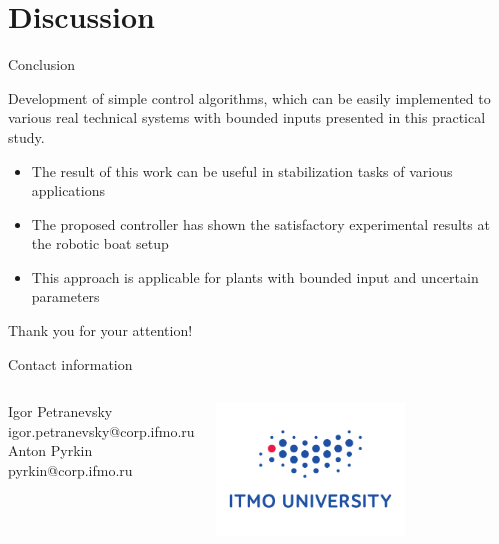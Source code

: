 \documentclass[10pt,pdf,hyperref={unicode}]{beamer}
\begin{document}
\section{Discussion}

\begin{frame}{Conclusion}

Development of simple control algorithms, which can be easily implemented to various real technical systems with bounded inputs presented in this practical study.

\begin{itemize}
	\item The result of this work can be useful in stabilization tasks of various applications 
	\item The proposed controller has shown the satisfactory experimental results at the robotic boat setup  
	\item This approach is applicable for plants with bounded input and uncertain parameters  
\end{itemize}
\end{frame}

\begin{frame}
	\begin{center}
		{\huge Thank you for your attention!}
	\end{center}
	\vspace{\baselineskip}
	\begin{center}
		Contact information
	\end{center}
	\begin{center}
		\begin{columns}
			Igor Petranevsky\\
			igor.petranevsky@corp.ifmo.ru \\
			\vspace{\baselineskip}
			Anton Pyrkin\\
			pyrkin@corp.ifmo.ru
			\begin{center}
				\includegraphics[width = 50mm]{fig/itmo1.png}
			\end{center}
		\end{columns}
	\end{center}
\end{frame}
\end{document}
